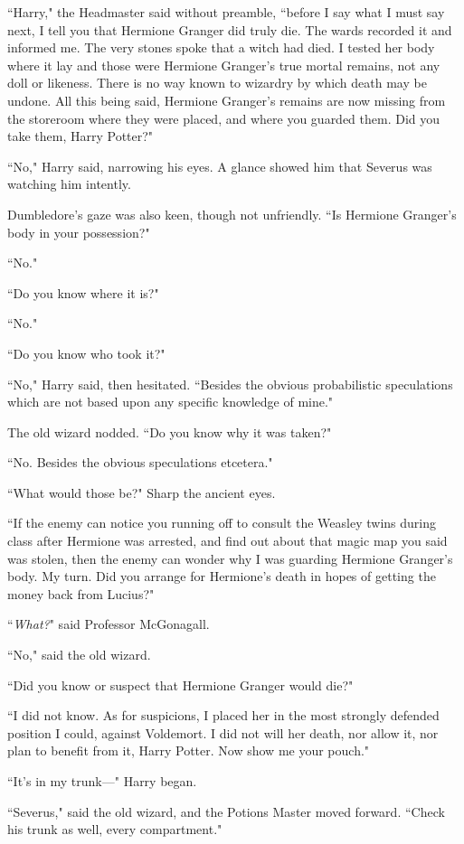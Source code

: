 ``Harry," the Headmaster said without preamble, ``before I say what I must say next, I tell you that Hermione Granger did truly die. The wards recorded it and informed me. The very stones spoke that a witch had died. I tested her body where it lay and those were Hermione Granger's true mortal remains, not any doll or likeness. There is no way known to wizardry by which death may be undone. All this being said, Hermione Granger's remains are now missing from the storeroom where they were placed, and where you guarded them. Did you take them, Harry Potter?"

``No," Harry said, narrowing his eyes. A glance showed him that Severus was watching him intently.

Dumbledore's gaze was also keen, though not unfriendly. ``Is Hermione Granger's body in your possession?"

``No."

``Do you know where it is?"

``No."

``Do you know who took it?"

``No," Harry said, then hesitated. ``Besides the obvious probabilistic speculations which are not based upon any specific knowledge of mine."

The old wizard nodded. ``Do you know why it was taken?"

``No. Besides the obvious speculations etcetera."

``What would those be?" Sharp the ancient eyes.

``If the enemy can notice you running off to consult the Weasley twins during class after Hermione was arrested, and find out about that magic map you said was stolen, then the enemy can wonder why I was guarding Hermione Granger's body. My turn. Did you arrange for Hermione's death in hopes of getting the money back from Lucius?"

``\emph{What?}" said Professor McGonagall.

``No," said the old wizard.

``Did you know or suspect that Hermione Granger would die?"

``I did not know. As for suspicions, I placed her in the most strongly defended position I could, against Voldemort. I did not will her death, nor allow it, nor plan to benefit from it, Harry Potter. Now show me your pouch."

``It's in my trunk—" Harry began.

``Severus," said the old wizard, and the Potions Master moved forward. ``Check his trunk as well, every compartment."

